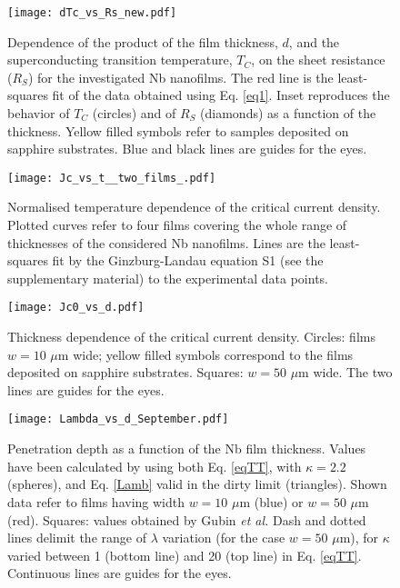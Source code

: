 \documentclass[reprint,onecolumn,superscriptaddress,a4paper,nofootinbib,floatfix]{revtex4-1}
\begin{document}
\begin{figure}[ht]
\centering
\texttt{[image: dTc\_vs\_Rs\_new.pdf]}
\caption{Dependence of the product of the film thickness, $d$, and the superconducting transition temperature, $T_C$, on the sheet resistance ($R_S$) for the investigated Nb nanofilms. The red line is the least-squares fit of the data obtained using Eq. \eqref{eq1}. Inset reproduces the behavior of $T_C$ (circles) and of $R_S$ (diamonds) as a function of the thickness. Yellow filled symbols refer to samples deposited on sapphire substrates. Blue and black lines are guides for the eyes.}  
\label{FigdTc_vsRs}
\end{figure}

\begin{figure}[ht]
\centering
\texttt{[image: Jc\_vs\_t\_\_two\_films\_.pdf]}
\caption{Normalised temperature dependence of the critical current density. Plotted curves refer to four films covering the whole range of thicknesses of the considered Nb nanofilms. Lines are the least-squares fit by the Ginzburg-Landau equation S1 (see the supplementary material) to the experimental data points.}
\label{Jc_vs_d}
\end{figure}

\begin{figure}[ht]
\centering
\texttt{[image: Jc0\_vs\_d.pdf]}
\caption{Thickness dependence of the critical current density. Circles: films $w = 10$ $\mu$m wide; yellow filled symbols correspond to the films deposited on sapphire substrates. Squares: $w = 50$ $\mu$m wide. The two lines are guides for the eyes.}  
\label{Jc0_vs_t}
\end{figure}

\begin{figure}[ht]
\centering
\texttt{[image: Lambda\_vs\_d\_September.pdf]}
\caption{Penetration depth as a function of the Nb film thickness. Values have been calculated by using both Eq. \eqref{eqTT}, with $\kappa = 2.2$ (spheres), and Eq. \eqref{Lamb} valid in the dirty limit (triangles). Shown data refer to films having width $w =10$ $\mu$m (blue) or $w = 50$ $\mu$m (red). Squares: values obtained by Gubin \textit{et al.}\cite{Gubin2005} Dash and dotted lines delimit the range of $\lambda$ variation (for the case $w = 50$ $\mu$m), for $\kappa$ varied between 1 (bottom line) and 20 (top line) in Eq. \eqref{eqTT}. Continuous lines are guides for the eyes.}  
\label{lambda}
\end{figure}
\end{document}
